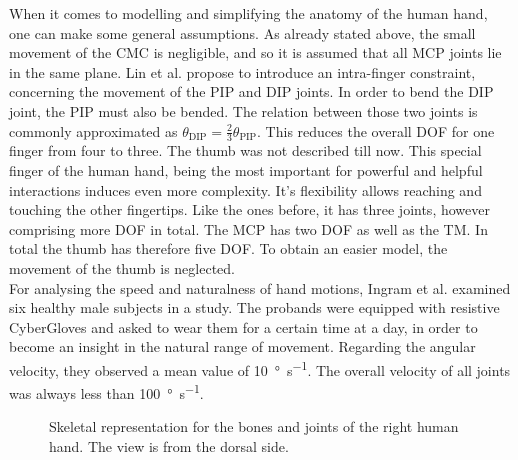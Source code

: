 When it comes to modelling and simplifying the anatomy of the human hand, one can make some general assumptions. As already stated above, the small movement of the \ac{CMC} is negligible, and so it is assumed that all \ac{MCP} joints lie in the same plane. Lin et al. propose to introduce an intra-finger constraint, concerning the movement of the \ac{PIP} and \ac{DIP} joints. In order to bend the \ac{DIP} joint, the \ac{PIP} must also be bended. The relation between those two joints is commonly approximated as $ \theta_{\mathrm{DIP}} = \frac{2}{3} \theta_{\mathrm{PIP}} $. This reduces the overall \ac{DOF} for one finger from four to three. The thumb was not described till now. This special finger of the human hand, being the most important for powerful and helpful interactions induces even more complexity. It's flexibility allows reaching and touching the other fingertips. Like the ones before, it has three joints, however comprising more \ac{DOF} in total. The \ac{MCP} has two \ac{DOF} as well as the \ac{TM}. In total the thumb has therefore five \ac{DOF}. To obtain an easier model, the movement of the thumb is neglected.\\
For analysing the speed and naturalness of hand motions, Ingram et al. \cite{ingram2008statistics} examined six healthy male subjects in a study. The probands were equipped with resistive CyberGloves and asked to wear them for a certain time at a day, in order to become an insight in the natural range of movement. Regarding the angular velocity, they observed a mean value of \SI[per-mode=symbol]{10}{\degree \per \second}. The overall velocity of all joints was always less than \SI[per-mode=symbol]{100}{\degree \per \second}.


\begin{figure}[h]
\centering
	\hfill
\caption[Bone and joint definitions of the human hand.]
{Skeletal representation for the bones and joints of the right human hand. The view is from the dorsal side.\cite{bullock2012assessing}}
\label{fig:skeletHand}
\end{figure}


